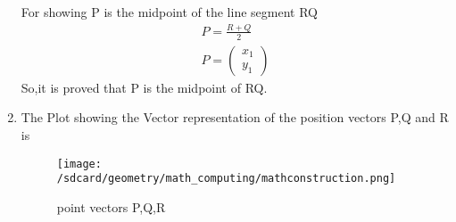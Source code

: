 \documentclass{article}
\newcommand{\myvec}[1]{\ensuremath{\begin{pmatrix}#1\end{pmatrix}}}
\begin{document}
\begin{enumerate}
\begin{table}[!ht]
    \end{table}
    For showing P is the midpoint of the line segment RQ
    \begin{align}
        P=\frac{R+Q}{2}\\
        P=\myvec{x_1\\y_1}
    \end{align}
    So,it is proved that P is the midpoint of RQ.
    \item The Plot showing the Vector representation of the position vectors P,Q and R is
    \begin{figure}[!ht]
        \centering
        \texttt{[image: /sdcard/geometry/math\_computing/mathconstruction.png]}
        \caption{point vectors P,Q,R}
        \label{fig:enter-label}
    \end{figure}
\end{enumerate}
\end{document}
